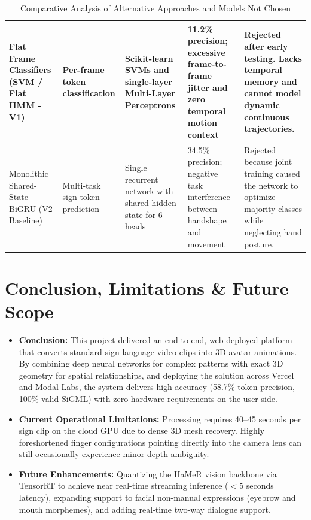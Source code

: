 \documentclass[11pt, a4paper]{article}
\begin{document}
\begin{table}[H]
\begin{tabular}{|p{2.4cm}|p{2.6cm}|p{2.6cm}|p{3.5cm}|p{3.8cm}|}
        \hline
        Flat Frame Classifiers (SVM / Flat HMM - V1) & Per-frame token classification & Scikit-learn SVMs and single-layer Multi-Layer Perceptrons & 11.2\% precision; excessive frame-to-frame jitter and zero temporal motion context & Rejected after early testing. Lacks temporal memory and cannot model dynamic continuous trajectories. \\
        \hline
        Monolithic Shared-State BiGRU (V2 Baseline) & Multi-task sign token prediction & Single recurrent network with shared hidden state for 6 heads & 34.5\% precision; negative task interference between handshape and movement & Rejected because joint training caused the network to optimize majority classes while neglecting hand posture. \\
        \hline
    \end{tabular}
    \caption{Comparative Analysis of Alternative Approaches and Models Not Chosen}
    \label{tab:comp_table}
\end{table}

\section{Conclusion, Limitations \& Future Scope}
\begin{itemize}[noitemsep, topsep=2pt]
    \item \textbf{Conclusion:} This project delivered an end-to-end, web-deployed platform that converts standard sign language video clips into 3D avatar animations. By combining deep neural networks for complex patterns with exact 3D geometry for spatial relationships, and deploying the solution across Vercel and Modal Labs, the system delivers high accuracy (58.7\% token precision, 100\% valid SiGML) with zero hardware requirements on the user side.
    \item \textbf{Current Operational Limitations:} Processing requires 40--45 seconds per sign clip on the cloud GPU due to dense 3D mesh recovery. Highly foreshortened finger configurations pointing directly into the camera lens can still occasionally experience minor depth ambiguity.
    \item \textbf{Future Enhancements:} Quantizing the HaMeR vision backbone via TensorRT to achieve near real-time streaming inference ($<5$ seconds latency), expanding support to facial non-manual expressions (eyebrow and mouth morphemes), and adding real-time two-way dialogue support.
\end{itemize}
\end{document}
